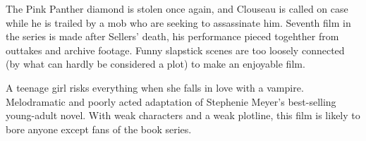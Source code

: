    The Pink Panther diamond is stolen once again, and Clouseau is called on case while he is trailed by a mob who are seeking to assassinate him. Seventh film in the series is made after Sellers' death, his performance pieced togehther from outtakes and archive footage. Funny slapstick scenes are too loosely connected (by what can hardly be considered a plot) to make an enjoyable film. \author{DW} 

   A teenage girl risks everything when she falls in love with a vampire. Melodramatic and poorly acted adaptation of Stephenie Meyer's best-selling young-adult novel. With weak characters and a weak plotline, this film is likely to bore anyone except fans of the book series. \author{DW} 
